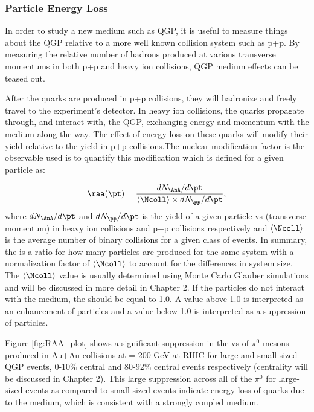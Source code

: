 \subsubsection{Particle Energy Loss}
In order to study a new medium such as QGP, it is useful to measure things about the QGP relative to a more well known collision system such as p+p. By measuring the relative number of hadrons produced at various transverse momentums in both p+p and heavy ion collisions, QGP medium effects can be teased out.

After the quarks are produced in p+p collisions, they will hadronize and freely travel to the experiment's detector. In heavy ion collisions, the quarks propagate through, and interact
with, the QGP, exchanging energy and momentum with the medium along the way. The effect of energy loss on these quarks will modify their yield relative to the yield in p+p collisions.The nuclear modification factor \raa is the observable used is to quantify this modification which is defined for a given particle as:

\begin{equation}\label{eqn:raa}
 \raa(\pt) = \frac{dN_{\AnA}/d\pt}{\left<\Ncoll\right>\times dN_{\pp}/d\pt},
\end{equation}
where $dN_{\AnA}/d\pt$ and $dN_{\pp}/d\pt$ is the yield of a given particle vs \pt (transverse momentum) in heavy ion collisions and p+p collisions respectively and $\left<\Ncoll\right>$ is the average number of binary collisions for a given class of events. In summary, the \raa is a ratio for how many particles are produced for the same system with a normalization factor of $\left<\Ncoll\right>$ to account for the differences in system size. The $\left<\Ncoll\right>$ value is usually determined using Monte Carlo Glauber simulations and will be discussed in more detail in Chapter 2. If the particles do not interact with the medium, the \raa should be equal to 1.0. A value above 1.0 is interpreted as an enhancement of particles and a value below 1.0 is interpreted as a suppression of particles. 

Figure \ref{fig:RAA_plot} shows a significant suppression in the \raa vs \pt  of $\pi^0$ mesons produced in Au+Au collisions at \sqsn = 200 GeV at RHIC for large and small sized QGP events, 0-10$\%$ central and 80-92$\%$ central events respectively (centrality will be discussed in Chapter 2). This large suppression across all  \pt of the $\pi^0$ for large-sized events as compared to small-sized events indicate energy loss of quarks due to the medium, which is consistent with a strongly coupled  medium.

